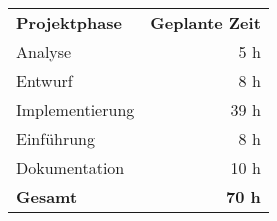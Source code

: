 
\begin{tabular}{lr}
\rowcolor{heading}\textbf{Projektphase} & \textbf{Geplante Zeit} \\
Analyse & 5 h \\
\rowcolor{odd}Entwurf & 8 h \\
Implementierung & 39 h \\
\rowcolor{odd}Einführung & 8 h \\
Dokumentation & 10 h \\
\hline
\hline
\rowcolor{odd}\textbf{Gesamt} & \textbf{70 h} \\
\end{tabular}
